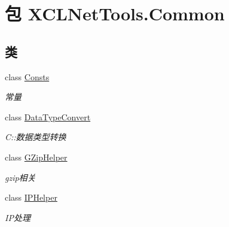\hypertarget{namespace_x_c_l_net_tools_1_1_common}{\section{包 X\-C\-L\-Net\-Tools.\-Common}
\label{namespace_x_c_l_net_tools_1_1_common}
}
\subsection*{类}
\begin{DoxyCompactItemize}
\item 
class \hyperlink{class_x_c_l_net_tools_1_1_common_1_1_consts}{Consts}
\begin{DoxyCompactList}\small\item\em 常量 \end{DoxyCompactList}\item 
class \hyperlink{class_x_c_l_net_tools_1_1_common_1_1_data_type_convert}{Data\-Type\-Convert}
\begin{DoxyCompactList}\small\item\em C\-::数据类型转换 \end{DoxyCompactList}\item 
class \hyperlink{class_x_c_l_net_tools_1_1_common_1_1_g_zip_helper}{G\-Zip\-Helper}
\begin{DoxyCompactList}\small\item\em gzip相关 \end{DoxyCompactList}\item 
class \hyperlink{class_x_c_l_net_tools_1_1_common_1_1_i_p_helper}{I\-P\-Helper}
\begin{DoxyCompactList}\small\item\em I\-P处理 \end{DoxyCompactList}\end{DoxyCompactItemize}
